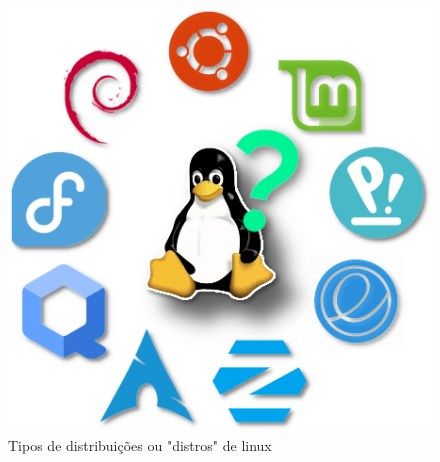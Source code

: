 \begin{figure}[H]
    \centering
    \includegraphics[scale=2.5]{Figures/0. General/linux_distros.png}
    \caption{Tipos de distribuições ou "distros" de linux}
    \label{Distros de linux}
\end{figure}

\newpage
